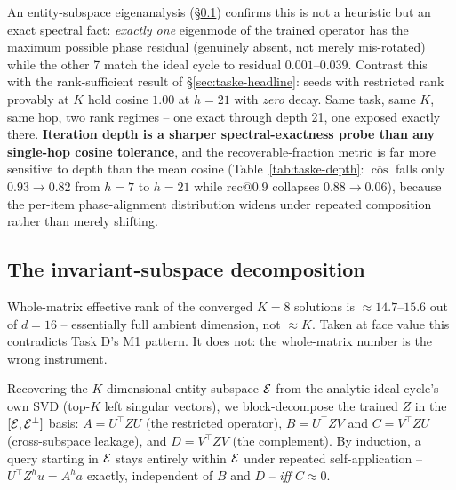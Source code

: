 An entity-subspace eigenanalysis (\S\ref{sec:taske-subspace}) confirms this
is not a heuristic but an exact spectral fact: \emph{exactly one} eigenmode
of the trained operator has the maximum possible phase residual (genuinely
absent, not merely mis-rotated) while the other 7 match the ideal cycle to
residual $0.001$--$0.039$. Contrast this with the rank-sufficient result of
\S\ref{sec:taske-headline}: seeds with restricted rank provably at $K$ hold
cosine $1.00$ at $h{=}21$ with \emph{zero} decay. Same task, same $K$, same
hop, two rank regimes -- one exact through depth 21, one exposed exactly
there. \textbf{Iteration depth is a sharper spectral-exactness probe than
any single-hop cosine tolerance}, and the recoverable-fraction metric is
far more sensitive to depth than the mean cosine (Table~\ref{tab:taske-depth}:
$\overline{\cos}$ falls only $0.93\to0.82$ from $h{=}7$ to $h{=}21$ while
$\mathrm{rec@0.9}$ collapses $0.88\to0.06$), because the per-item
phase-alignment distribution widens under repeated composition rather than
merely shifting.

\subsection{The invariant-subspace decomposition}
\label{sec:taske-subspace}

Whole-matrix effective rank of the converged $K{=}8$ solutions is
$\approx14.7$--$15.6$ out of $d{=}16$ -- essentially full ambient
dimension, not $\approx K$. Taken at face value this contradicts Task D's
M1 pattern. It does not: the whole-matrix number is the wrong instrument.

Recovering the $K$-dimensional entity subspace $\mathcal{E}$ from the analytic ideal
cycle's own SVD (top-$K$ left singular vectors), we block-decompose the
trained $Z$ in the $[\mathcal{E},\mathcal{E}^\perp]$ basis: $A=U^\top ZU$ (the restricted
operator), $B=U^\top ZV$ and $C=V^\top ZU$ (cross-subspace leakage), and
$D=V^\top ZV$ (the complement). By induction, a query starting in $\mathcal{E}$
stays entirely within $\mathcal{E}$ under repeated self-application -- $U^\top
Z^hu=A^ha$ exactly, independent of $B$ and $D$ -- \emph{iff} $C\approx0$.

